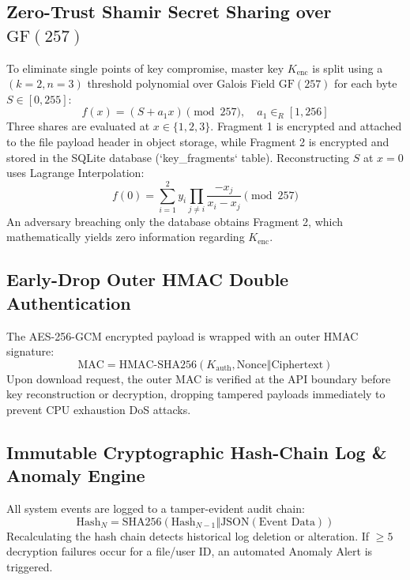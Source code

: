 \documentclass[journal,twoside]{IEEEtran}
\begin{document}
\subsection{Zero-Trust Shamir Secret Sharing over $\text{GF}(257)$}
To eliminate single points of key compromise, master key $K_{\text{enc}}$ is split using a $(k=2, n=3)$ threshold polynomial over Galois Field $\text{GF}(257)$ for each byte $S \in [0, 255]$:
\begin{equation}
f(x) = (S + a_1 x) \pmod{257}, \quad a_1 \in_R [1, 256]
\end{equation}
Three shares are evaluated at $x \in \{1, 2, 3\}$. Fragment 1 is encrypted and attached to the file payload header in object storage, while Fragment 2 is encrypted and stored in the SQLite database (`key_fragments` table). Reconstructing $S$ at $x=0$ uses Lagrange Interpolation:
\begin{equation}
f(0) = \sum_{i=1}^{2} y_i \prod_{j \neq i} \frac{-x_j}{x_i - x_j} \pmod{257}
\end{equation}
An adversary breaching only the database obtains Fragment 2, which mathematically yields zero information regarding $K_{\text{enc}}$.

\subsection{Early-Drop Outer HMAC Double Authentication}
The AES-256-GCM encrypted payload is wrapped with an outer HMAC signature:
\begin{equation}
\text{MAC} = \text{HMAC-SHA256}(K_{\text{auth}}, \text{Nonce} \mathbin{\Vert} \text{Ciphertext})
\end{equation}
Upon download request, the outer MAC is verified at the API boundary before key reconstruction or decryption, dropping tampered payloads immediately to prevent CPU exhaustion DoS attacks.

\subsection{Immutable Cryptographic Hash-Chain Log & Anomaly Engine}
All system events are logged to a tamper-evident audit chain:
\begin{equation}
\text{Hash}_N = \text{SHA256}(\text{Hash}_{N-1} \mathbin{\Vert} \text{JSON}(\text{Event Data}))
\end{equation}
Recalculating the hash chain detects historical log deletion or alteration. If $\ge 5$ decryption failures occur for a file/user ID, an automated Anomaly Alert is triggered.
\end{document}
